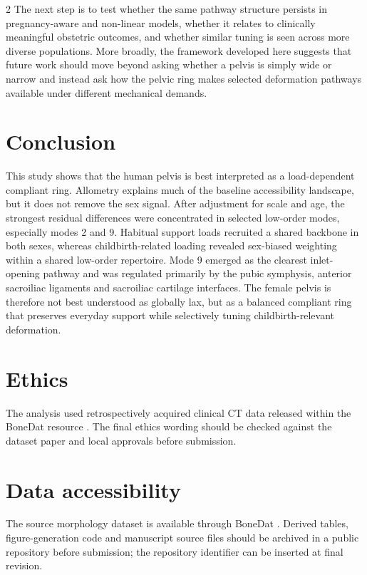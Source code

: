 \documentclass[openacc]{rsproca_new}
\begin{document}
\begin{multicols}{2}
The next step is to test whether the same pathway structure persists in pregnancy-aware and non-linear models, whether it relates to clinically meaningful obstetric outcomes, and whether similar tuning is seen across more diverse populations. More broadly, the framework developed here suggests that future work should move beyond asking whether a pelvis is simply wide or narrow and instead ask how the pelvic ring makes selected deformation pathways available under different mechanical demands.

\section{Conclusion}

This study shows that the human pelvis is best interpreted as a load-dependent compliant ring. Allometry explains much of the baseline accessibility landscape, but it does not remove the sex signal. After adjustment for scale and age, the strongest residual differences were concentrated in selected low-order modes, especially modes 2 and 9. Habitual support loads recruited a shared backbone in both sexes, whereas childbirth-related loading revealed sex-biased weighting within a shared low-order repertoire. Mode 9 emerged as the clearest inlet-opening pathway and was regulated primarily by the pubic symphysis, anterior sacroiliac ligaments and sacroiliac cartilage interfaces. The female pelvis is therefore not best understood as globally lax, but as a balanced compliant ring that preserves everyday support while selectively tuning childbirth-relevant deformation.

\section*{Ethics}

The analysis used retrospectively acquired clinical CT data released within the BoneDat resource \cite{henys2025}. The final ethics wording should be checked against the dataset paper and local approvals before submission.

\section*{Data accessibility}

The source morphology dataset is available through BoneDat \cite{henys2025}. Derived tables, figure-generation code and manuscript source files should be archived in a public repository before submission; the repository identifier can be inserted at final revision.


\end{multicols}
\end{document}
